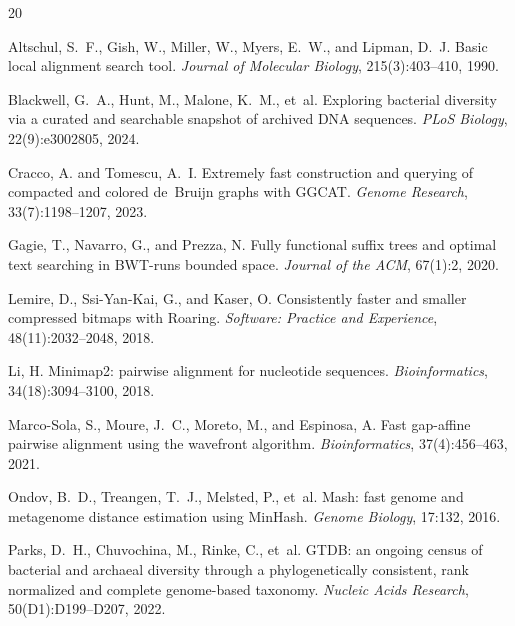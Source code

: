 \documentclass[11pt]{article}
\begin{document}
\begin{thebibliography}{20}

Altschul, S.~F., Gish, W., Miller, W., Myers, E.~W., and Lipman, D.~J.
\newblock Basic local alignment search tool.
\newblock \emph{Journal of Molecular Biology}, 215(3):403--410, 1990.

Blackwell, G.~A., Hunt, M., Malone, K.~M., et~al.
\newblock Exploring bacterial diversity via a curated and searchable snapshot of archived DNA sequences.
\newblock \emph{PLoS Biology}, 22(9):e3002805, 2024.

Cracco, A. and Tomescu, A.~I.
\newblock Extremely fast construction and querying of compacted and colored de~Bruijn graphs with GGCAT.
\newblock \emph{Genome Research}, 33(7):1198--1207, 2023.

Gagie, T., Navarro, G., and Prezza, N.
\newblock Fully functional suffix trees and optimal text searching in BWT-runs bounded space.
\newblock \emph{Journal of the ACM}, 67(1):2, 2020.

Lemire, D., Ssi-Yan-Kai, G., and Kaser, O.
\newblock Consistently faster and smaller compressed bitmaps with Roaring.
\newblock \emph{Software: Practice and Experience}, 48(11):2032--2048, 2018.

Li, H.
\newblock Minimap2: pairwise alignment for nucleotide sequences.
\newblock \emph{Bioinformatics}, 34(18):3094--3100, 2018.

Marco-Sola, S., Moure, J.~C., Moreto, M., and Espinosa, A.
\newblock Fast gap-affine pairwise alignment using the wavefront algorithm.
\newblock \emph{Bioinformatics}, 37(4):456--463, 2021.

Ondov, B.~D., Treangen, T.~J., Melsted, P., et~al.
\newblock Mash: fast genome and metagenome distance estimation using MinHash.
\newblock \emph{Genome Biology}, 17:132, 2016.

Parks, D.~H., Chuvochina, M., Rinke, C., et~al.
\newblock GTDB: an ongoing census of bacterial and archaeal diversity through a phylogenetically consistent, rank normalized and complete genome-based taxonomy.
\newblock \emph{Nucleic Acids Research}, 50(D1):D199--D207, 2022.


\end{thebibliography}
\end{document}
